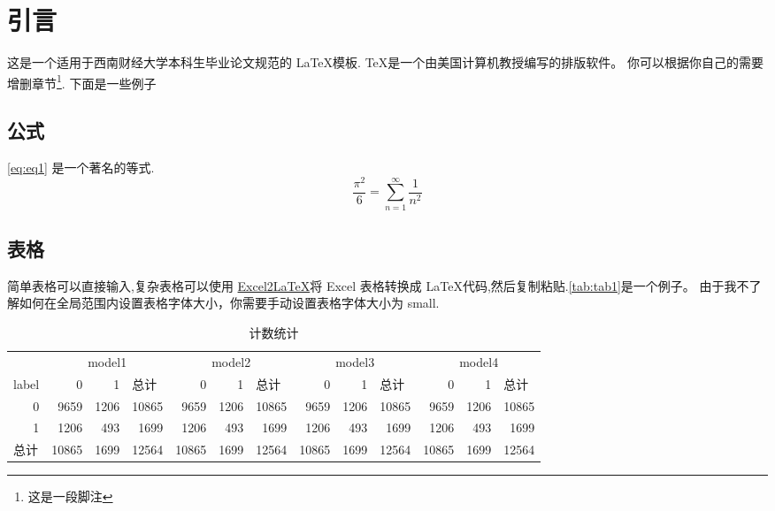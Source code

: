 \section{引言}
这是一个适用于西南财经大学本科生毕业论文规范的 \LaTeX \cite{lamport1994latex,goossens1994latex}模板.
\TeX 是一个由美国计算机教授\citet{knuth1984texbook}编写的排版软件。
你可以根据你自己的需要增删章节\footnote{这是一段脚注}. 下面是一些例子

\subsection{公式}
\autoref{eq:eq1} 是一个著名的等式.
\begin{equation}\label{eq:eq1}
    \frac{\pi^2}{6}=\sum_{n=1}^{\infty}\frac{1}{n^2}
\end{equation}
\subsection{表格}
简单表格可以直接输入,复杂表格可以使用 \href{https://github.com/krlmlr/Excel2LaTeX}{Excel2LaTeX}将 Excel 表格转换成 \LaTeX 代码,然后复制粘贴.\autoref{tab:tab1}是一个例子。 由于我不了解如何在全局范围内设置表格字体大小，你需要手动设置表格字体大小为 small.
\begin{table}[htbp]
    \centering
    \caption{计数统计}
      \begin{tabular}{|l|rrr|rrr|rrr|rrr|}
      \hline
        & \multicolumn{3}{c|}{model1} & \multicolumn{3}{c|}{model2} & \multicolumn{3}{c|}{model3} & \multicolumn{3}{c|}{model4} \bigstrut\\
  \cline{2-13}    label & 0 & 1 & \multicolumn{1}{l|}{总计} & 0 & 1 & \multicolumn{1}{l|}{总计} & 0 & 1 & \multicolumn{1}{l|}{总计} & 0 & 1 & \multicolumn{1}{l|}{总计} \bigstrut\\
      \hline
      \multicolumn{1}{|r|}{0} & 9659 & 1206 & 10865 & 9659 & 1206 & 10865 & 9659 & 1206 & 10865 & 9659 & 1206 & 10865 \bigstrut[t]\\
      \multicolumn{1}{|r|}{1} & 1206 & 493 & 1699 & 1206 & 493 & 1699 & 1206 & 493 & 1699 & 1206 & 493 & 1699 \\
      总计 & 10865 & 1699 & 12564 & 10865 & 1699 & 12564 & 10865 & 1699 & 12564 & 10865 & 1699 & 12564 \bigstrut[b]\\
      \hline
      \end{tabular}%
    \label{tab:tab1}%
  \end{table}%
  
